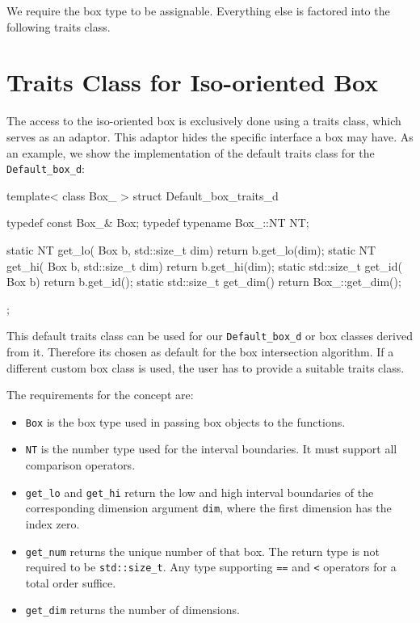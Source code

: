 We require the box type to be assignable. Everything else is 
factored into the following traits class.

\section{Traits Class for Iso-oriented Box}

The access to the iso-oriented box is exclusively done using a 
traits class, which serves as an adaptor. This adaptor hides the
specific interface a box may have. As an example, we show the
implementation of the default traits class for the
\texttt{Default\_box\_d}:

\begin{ccExampleCode}
template< class Box_ >
struct Default_box_traits_d {
    typedef const Box_&       Box;
    typedef typename Box_::NT NT;

    static NT          get_lo( Box b, std::size_t dim) { return b.get_lo(dim);  }
    static NT          get_hi( Box b, std::size_t dim) { return b.get_hi(dim);  }
    static std::size_t get_id( Box b)                  { return b.get_id();     }
    static std::size_t get_dim()                       { return Box_::get_dim();}
};
\end{ccExampleCode}

This default traits class can be used for our \texttt{Default\_box\_d}
or box classes derived from it. Therefore its chosen as default for
the box intersection algorithm. If a different custom box class is
used, the user has to provide a suitable traits class.

The requirements for the  concept are:
\begin{itemize}
    \item 
      \texttt{Box} is the box type used in passing box objects to the
      functions.
    \item
      \texttt{NT} is the number type used for the interval
      boundaries. It must support all comparison operators.
    \item 
      \texttt{get\_lo} and \texttt{get\_hi} return the low and high
      interval boundaries of the corresponding dimension argument
      \texttt{dim}, where the first  dimension has the index zero.
    \item 
      \texttt{get\_num} returns the unique number of that box. The
      return type is not required to be \texttt{std::size\_t}. Any
      type supporting \texttt{==} and \texttt{<} operators for a total
      order suffice.
    \item
      \texttt{get\_dim} returns the number of dimensions. 
\end{itemize}

